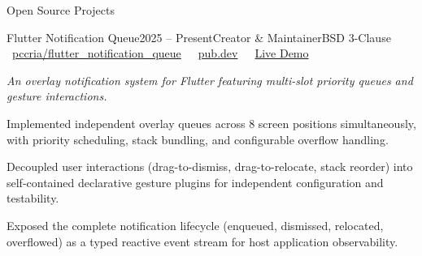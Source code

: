 \documentclass[
	a4paper,
	11pt,
]{resume}
\begin{document}
\begin{rSection}{Open Source Projects}
    \begin{rSubsection}{Flutter Notification Queue}{2025 -- Present}{Creator \& Maintainer}{BSD 3-Clause \hfill \footnotesize\textcolor{bluegray}{\faClean{\faGithubAlt}~\href{https://github.com/pccria/flutter_notification_queue}{pccria/flutter\_notification\_queue}~\textperiodcentered~\faClean{\faCube}~\href{https://pub.dev/packages/flutter_notification_queue}{pub.dev}~\textperiodcentered~\faClean{\faDesktop}~\href{https://pccria.github.io/flutter_notification_queue/}{Live Demo}}}
        \item[] {\small\textit{An overlay notification system for Flutter featuring multi-slot priority queues and gesture interactions.}}
        \item Implemented independent overlay queues across 8 screen positions simultaneously, with priority scheduling, stack bundling, and configurable overflow handling.
        \item Decoupled user interactions (drag-to-dismiss, drag-to-relocate, stack reorder) into self-contained declarative gesture plugins for independent configuration and testability.
        \item Exposed the complete notification lifecycle (enqueued, dismissed, relocated, overflowed) as a typed reactive event stream for host application observability.
        \\      
    \end{rSubsection}

\end{rSection}

\newpage

\end{document}
